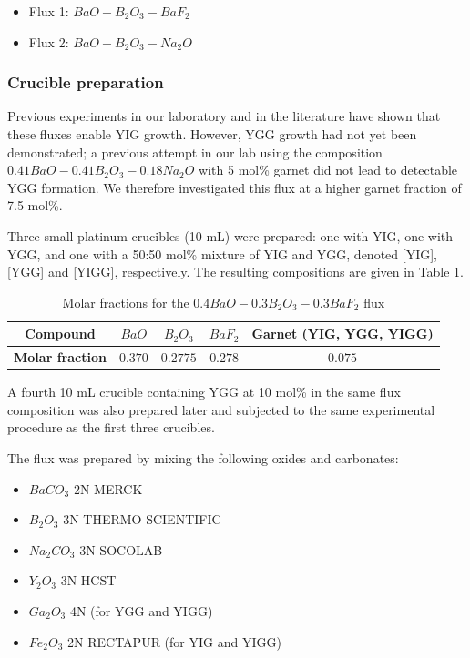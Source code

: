 \documentclass{rapportENSCP}
\begin{document}
\begin{itemize}
    \item Flux 1: $BaO - B_2O_3 - BaF_2$
    \item Flux 2: $BaO - B_2O_3 - Na_2O$
\end{itemize}

\subsubsection{Crucible preparation}
Previous experiments in our laboratory and in the literature have shown that these fluxes enable YIG growth. However, YGG growth had not yet been demonstrated; a previous attempt in our lab using the composition
$0.41BaO - 0.41B_2O_3 - 0.18Na_2O$ with 5 mol\% garnet did not lead to detectable YGG formation. We therefore investigated this flux at a higher garnet fraction of 7.5 mol\%.

Three small platinum crucibles (10 mL) were prepared: one with YIG, one with YGG, and one with a 50:50 mol\% mixture of YIG and YGG, denoted [YIG], [YGG] and [YIGG], respectively. The resulting compositions are given in Table \ref{tab:composition_flux_1}.

\begin{table}[h]
\centering
\begin{tabular}{|c|c|c|c|c|}
    \hline
    \textbf{Compound} & $BaO$ & $B_2O_3$ & $BaF_2$ & Garnet (YIG, YGG, YIGG) \\
    \hline
    \textbf{Molar fraction} & $0.370$ & $0.2775$ & $0.278$ & $0.075$ \\
    \hline
\end{tabular}
\caption{Molar fractions for the $0.4BaO - 0.3B_2O_3 - 0.3BaF_2$ flux}
\label{tab:composition_flux_1}
\end{table}

A fourth 10 mL crucible containing YGG at 10 mol\% in the same flux composition was also prepared later and subjected to the same experimental procedure as the first three crucibles.

The flux was prepared by mixing the following oxides and carbonates:
\begin{itemize}
    \item $BaCO_3$ 2N MERCK
    \item $B_2O_3$ 3N THERMO SCIENTIFIC
    \item $Na_2CO_3$ 3N SOCOLAB
    \item $Y_2O_3$ 3N HCST
    \item $Ga_2O_3$ 4N (for YGG and YIGG)
    \item $Fe_2O_3$ 2N RECTAPUR (for YIG and YIGG)
\end{itemize}
\end{document}
